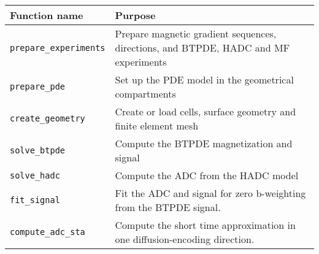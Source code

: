 \begin{tabular}{|l|p{10cm}|} \hline
    Function name           & Purpose                                                                                                                                                                                                     \\ \hline
    \verb+prepare_experiments+  & Prepare magnetic gradient sequences, directions, and BTPDE, HADC and MF experiments                                                                                                                         \\ \hline
    \verb+prepare_pde+  & Set up the PDE model in the geometrical compartments                                                                                                                                                        \\ \hline
    \verb+create_geometry+  & Create or load cells, surface geometry and finite element mesh                                                                                                                                              \\ \hline
    \verb+solve_btpde+  & Compute the BTPDE magnetization and signal                                                                                                                                                                  \\ \hline
    \verb+solve_hadc+  & Compute the ADC from the HADC model                                                                                                                                                                         \\ \hline
    \verb+fit_signal+ & Fit the ADC and signal for zero b-weighting from the BTPDE signal.                                                                                                                                          \\ \hline
    \verb+compute_adc_sta+ & Compute the short time approximation in one diffusion-encoding direction.                                                                                                                                   \\ \hline

\end{tabular}
